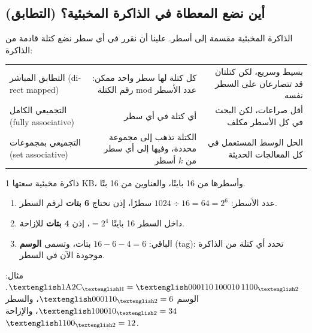 \subsection{أين نضع المعطاة في الذاكرة المخبئية؟ (التطابق)}
الذاكرة المخبئية مقسمة إلى أسطر. علينا أن نقرر في أي سطر نضع كتلة قادمة من الذاكرة:

\begin{center}
\small
\begin{tabularx}{\linewidth}{|>{\centering\arraybackslash}p{3.4cm}|R|R|}
    \hline
     &  &  \\ \hline
    التطابق المباشر \textenglish{(direct mapped)} & كل كتلة لها سطر واحد ممكن: رقم الكتلة \textenglish{mod} عدد الأسطر & بسيط وسريع، لكن كتلتان قد تتصارعان على السطر نفسه \\ \hline
    التجميعي الكامل \textenglish{(fully associative)} & أي كتلة في أي سطر & أقل صراعات، لكن البحث في كل الأسطر مكلف \\ \hline
    التجميعي بمجموعات \textenglish{(set associative)} & الكتلة تذهب إلى مجموعة محددة، وفيها إلى أي سطر من $k$ أسطر & الحل الوسط المستعمل في كل المعالجات الحديثة \\ \hline
\end{tabularx}
\end{center}

\begin{khatwa}
    ذاكرة مخبئية سعتها \textenglish{1 KB}، وأسطرها من 16 بايتًا، والعناوين من 16 بتًا.
    \begin{enumerate}
        \item عدد الأسطر: $1024 \div 16 = 64 = 2^6$ سطرًا، إذن نحتاج \textbf{6 بتات} لرقم السطر.
        \item داخل السطر 16 بايتًا $= 2^4$، إذن \textbf{4 بتات} للإزاحة.
        \item الباقي: $16 - 6 - 4 = 6$ بتات، وتسمى \textbf{الوسم} \textenglish{(tag)}: تحدد أي كتلة من الذاكرة موجودة الآن في السطر.
    \end{enumerate}
    \begin{center}
    \end{center}
    مثال: $\hex{1A2C} = \bin{000110\,100010\,1100}$. الوسم $\bin{000110} = 6$، والسطر $\bin{100010} = 34$، والإزاحة $\bin{1100} = 12$.
\end{khatwa}

